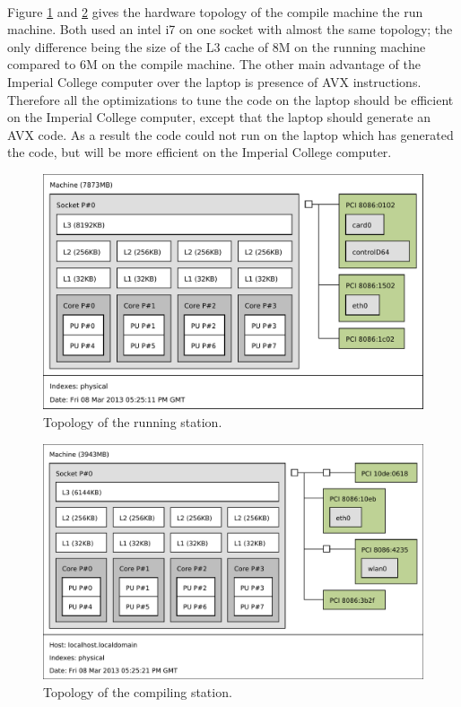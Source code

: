 \documentclass[fleqn,11pt]{SelfArx} %
\theoremstyle{definition}
\begin{document}
\paragraph{}

Figure \ref{topoR} and \ref{topoC} gives the hardware topology of the compile machine the run machine. Both used an intel i7 on one socket with almost the same topology; the only difference being the size of the L3 cache of 8M on the running machine compared to 6M on the compile machine. The other main advantage of the Imperial College computer over the laptop is presence of AVX instructions. Therefore all the optimizations to tune the code on the laptop should be efficient on the Imperial College computer, except that the laptop should generate an AVX code. As a result the code could not run on the laptop which has generated the code, but will be more efficient on the Imperial College computer.

\begin{figure}
	\centering

	\includegraphics[width=.48\textwidth]{run.pdf}

	\caption{Topology of the running station.}
	\label{topoR}
\end{figure}

\begin{figure}
	\centering

	\includegraphics[width=.48\textwidth]{compile.pdf}

	\caption{Topology of the compiling station.}
	\label{topoC}
\end{figure}


\FloatBarrier
\end{document}
